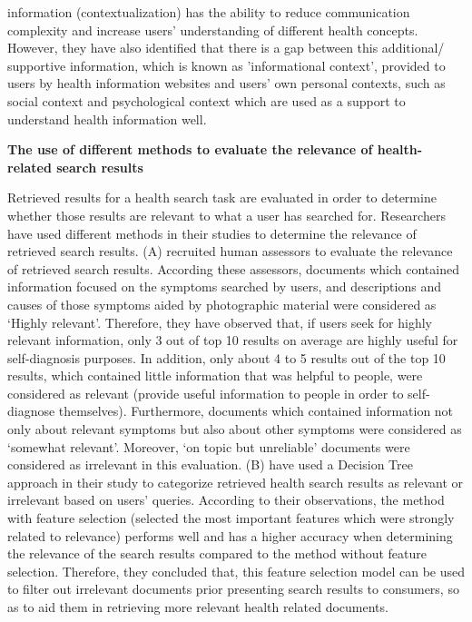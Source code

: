 \documentclass[]{article}
\begin{document}
information (contextualization) has the ability to reduce communication complexity and increase users' understanding of different health concepts. However, they have also identified that there is a gap between this additional/ supportive information, which is known as 'informational context', provided to users by health information websites and users' own personal contexts, such as social context and psychological context which are used as a support to understand health information well.  

\textbf{The use of different methods to evaluate the relevance of health-related search results}

Retrieved results for a health search task are evaluated in order to determine whether those results are relevant to what a user has searched for. Researchers have used different methods in their studies to determine the relevance of retrieved search results. (A) recruited human assessors to evaluate the relevance of retrieved search results. According these assessors, documents which contained information focused on the symptoms searched by users, and descriptions and causes of those symptoms aided by photographic material were considered as ‘Highly relevant’. Therefore, they have observed that, if users seek for highly relevant information, only 3 out of top 10 results on average are highly useful for self-diagnosis purposes. In addition, only about 4 to 5 results out of the top 10 results, which contained little information that was helpful to people, were considered as relevant (provide useful information to people in order to self-diagnose themselves). Furthermore, documents which contained information not only about relevant symptoms but also about other symptoms were considered as ‘somewhat relevant’. Moreover, ‘on topic but unreliable’ documents were considered as irrelevant in this evaluation. (B) have used a Decision Tree approach in their study to categorize retrieved health search results as relevant or irrelevant based on users' queries. According to their observations, the method with feature selection (selected the most important features which were strongly related to relevance) performs well and has a higher accuracy when determining the relevance of the search results compared to the method without feature selection. Therefore, they concluded that, this feature selection model can be used to filter out irrelevant documents prior presenting search results to consumers, so as to aid them in retrieving more relevant health related documents.     
\end{document}
